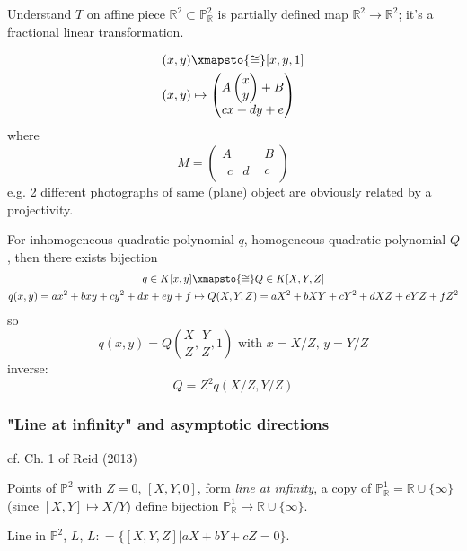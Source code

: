 \documentclass[10pt]{amsart}
\begin{document}
\begin{multicols*}{2}
Understand $T$ on affine piece $\mathbb{R}^2 \subset \mathbb{P}^2_{\mathbb{R}}$ is partially defined map $\mathbb{R}^2 \to \mathbb{R}^2$; it's a fractional linear transformation.

\[
\begin{gathered}
	\begin{aligned}
	& (x,y) \xmapsto{\cong} [x,y, 1] \\
	& (x,y) \mapsto \left( \begin{matrix} A \left( \begin{matrix} x \\ y \end{matrix} \right) + B \\ cx + dy + e \end{matrix} \right) 
	\end{aligned}
\end{gathered}
\]
where 
\[
M = \left( \begin{array}{c|c} A & B \\ \begin{matrix} c & d \end{matrix} & e \end{array} \right) 
\]
e.g. 2 different photographs of same (plane) object are obviously related by a projectivity.

For inhomogeneous quadratic polynomial $q$, homogeneous quadratic polynomial $Q$, then there exists bijection
\[
\begin{gathered}
	q \in K[x,y] \xmapsto{\cong} Q \in K[X,Y,Z] \\
	q(x,y) = ax^2 + bxy + cy^2 + dx + ey + f \mapsto Q(X,Y,Z) = aX^2 + bXY + cY^2 + dXZ + eYZ + fZ^2 
\end{gathered}
\]
so
\[
q(x,y) = Q\left( \frac{X}{Z} , \frac{Y}{Z} , 1 \right) \text{ with } x= X/Z, \, y = Y/Z
\]
inverse:
\[
Q = Z^2 q(X/Z, Y/Z)
\]


\subsubsection{"Line at infinity" and asymptotic directions}

cf. Ch. 1 of Reid (2013)

Points of $\mathbb{P}^2$ with $Z=0$, $[X,Y,0]$, form \emph{line at infinity}, a copy of $\mathbb{P}^1_{\mathbb{R}} = \mathbb{R} \cup \lbrace \infty \rbrace$ (since $[X,Y] \mapsto X/Y$) define bijection $\mathbb{P}^1_{\mathbb{R}} \to \mathbb{R} \cup \lbrace \infty \rbrace$. 

Line in $\mathbb{P}^2$, $L$, $L: = \lbrace [ X, Y,Z] | aX + bY + cZ = 0 \rbrace$. 


\end{multicols*}
\end{document}
